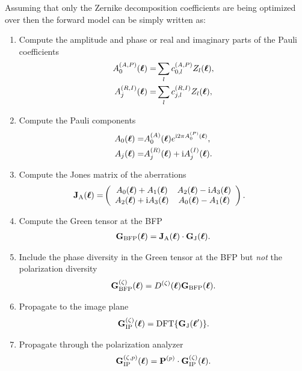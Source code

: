 \documentclass[reprint,aps,pra,superscriptaddress,
amsmath,amssymb]{revtex4-1}
\begin{document}
Assuming that only the Zernike decomposition coefficients are being 
optimized over then the forward model can be simply written as:
\begin{enumerate}
\item Compute the amplitude and phase or real and imaginary parts of the 
Pauli coefficients
\begin{align*}
A_{0}^{(A,P)} (\boldsymbol \ell) = &\sum_l c_{0,l}^{(A,P)}Z_l(\boldsymbol \ell) ,\\
A_{j}^{(R,I)} (\boldsymbol \ell) = &\sum_l c_{j,l}^{(R,I)}Z_l(\boldsymbol \ell),
\end{align*}
\item Compute the Pauli components
\begin{align*}
A_0(\boldsymbol \ell)  = &A_0^{(A)}(\boldsymbol \ell)  e^{\text{i} 2 \pi  A_0^{(P)}(\boldsymbol \ell) },\\
A_j (\boldsymbol \ell) = & A_j^{(R)}(\boldsymbol \ell)  + \text{i} A_j^{(I)} (\boldsymbol \ell) .
\end{align*}
\item Compute the Jones matrix of the aberrations
\begin{align*}
\textbf J_\text{A}(\boldsymbol \ell) 
=& \left(
\begin{array}{cc}
A_0 (\boldsymbol \ell)  + A_1 (\boldsymbol \ell) & A_2(\boldsymbol \ell) - \text{i} A_3(\boldsymbol \ell)   \\
A_2 (\boldsymbol \ell) + \text{i} A_3 (\boldsymbol \ell)  & A_0(\boldsymbol \ell)  - A_1(\boldsymbol \ell) 
\end{array}
\right).
\end{align*}
\item Compute the Green tensor at the BFP 
\begin{align*}
\textbf G_\text{BFP} (\boldsymbol \ell) =    \textbf J_\text{A}(\boldsymbol \ell) \cdot \textbf G_\text{J}  (\boldsymbol \ell).
\end{align*}
\item Include the phase diversity in the Green tensor at the BFP  but \emph{not} the polarization diversity
\begin{align*}
\textbf G^{(\zeta )}_\text{BFP} (\boldsymbol \ell) =  D^{(\zeta )} (\boldsymbol \ell)  \textbf G_\text{BFP}  (\boldsymbol \ell).
\end{align*}
\item  Propagate to the image plane 
\begin{align*}
\textbf G^{(\zeta )}_\text{IP} (\boldsymbol \ell) =  \text{DFT} \{ \textbf G_\text{J}  (\boldsymbol \ell' ) \} .
\end{align*}
\item Propagate through the polarization analyzer
\begin{align*}
\bt G^{(\zeta , p)}_\text{IP} (\bs \ell) = \bt P^{(p)} \cdot \bt G^{(\zeta )}_\text{IP} (\bs \ell)  .

\end{align*}
\end{enumerate}
\end{document}
